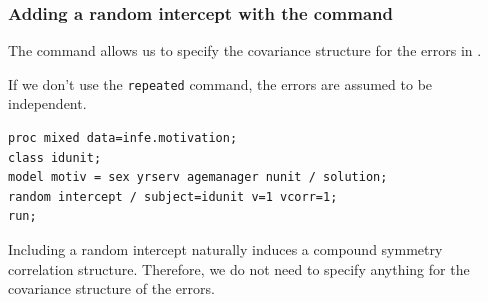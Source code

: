 \documentclass{beamer}
\begin{document}
\begin{frame}[fragile]
\frametitle{Adding a random intercept with the  command} 
\bi 
\item The command  allows us to specify the covariance structure for the errors in . 
\item If we don't use the \texttt{repeated} command, the errors are assumed to be independent.
\ei
\begin{tcolorbox}[colback=white, colframe=hecblue, title=\SASlang{} code for a random intercept model with independent errors]
\begin{small}
\begin{verbatim}
proc mixed data=infe.motivation; 
class idunit; 
model motiv = sex yrserv agemanager nunit / solution; 
random intercept / subject=idunit v=1 vcorr=1; 
run;
\end{verbatim}
\end{small}
\end{tcolorbox}
{ \footnotesize   Including a random intercept \alert{naturally} induces a compound symmetry correlation structure.
Therefore, we do not need to specify anything for the covariance structure of the errors.


}
\end{frame}
% 
% 
\end{document}
